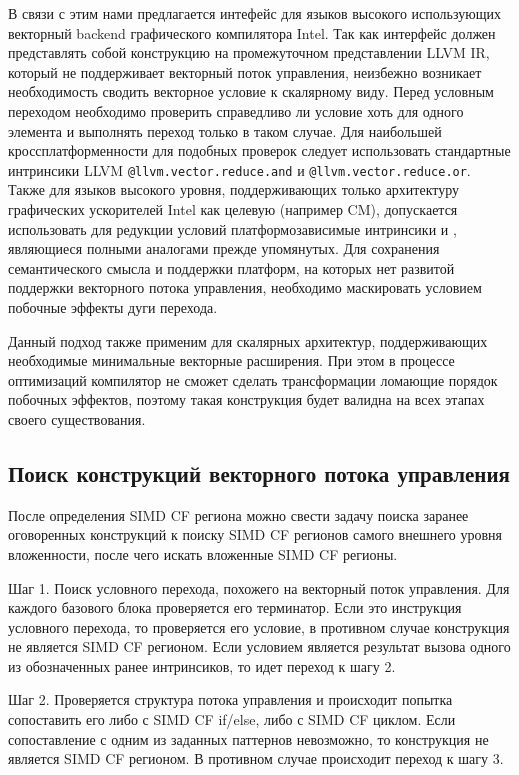 В связи с этим нами предлагается интефейс для языков высокого использующих векторный backend графического компилятора Intel. Так как интерфейс должен представлять собой конструкцию на промежуточном представлении LLVM IR, который не поддерживает векторный поток управления, неизбежно возникает необходимость сводить векторное условие к скалярному виду. Перед условным переходом необходимо проверить справедливо ли условие хоть для одного элемента и выполнять переход только в таком случае. Для наибольшей кроссплатформенности для подобных проверок следует использовать стандартные интринсики LLVM \texttt{@llvm.vector.reduce.and} и \texttt{@llvm.vector.reduce.or}. Также для языков высокого уровня, поддерживающих только архитектуру графических ускорителей Intel как целевую (например CM), допускается использовать для редукции условий платформозависимые интринсики  и , являющиеся полными аналогами прежде упомянутых. Для сохранения семантического смысла и поддержки платформ, на которых нет развитой поддержки векторного потока управления, необходимо маскировать условием побочные эффекты дуги перехода.

Данный подход также применим для скалярных архитектур, поддерживающих необходимые минимальные векторные расширения. При этом в процессе оптимизаций компилятор не сможет сделать трансформации ломающие порядок побочных эффектов, поэтому такая конструкция будет валидна на всех этапах своего существования.

\subsection{Поиск конструкций векторного потока управления}\label{sec:lowering/simdcf/optimization}

После определения SIMD CF региона можно свести задачу поиска заранее оговоренных конструкций к поиску SIMD CF регионов самого внешнего уровня вложенности, после чего искать вложенные SIMD CF регионы.

Шаг 1. Поиск условного перехода, похожего на векторный поток управления. Для каждого базового блока проверяется его терминатор. Если это инструкция условного перехода, то проверяется его условие, в противном случае конструкция не является SIMD CF регионом. Если условием является результат вызова одного из обозначенных ранее интринсиков, то идет переход к шагу 2.

Шаг 2. Проверяется структура потока управления и происходит попытка сопоставить его либо с SIMD CF if/else, либо с SIMD CF циклом. Если сопоставление с одним из заданных паттернов невозможно, то конструкция не является SIMD CF регионом. В противном случае происходит переход к шагу 3.

